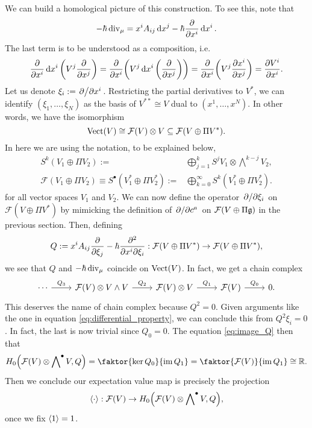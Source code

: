 We can build a homological picture of this construction. To see this, note that
\begin{equation}
-\hbar\operatorname{div}_\mu=x^i A_{ij}\dd{x}^j-\hbar\pdv{x^i}\dd{x^i}.
\end{equation}
The last term is to be understood as a composition, i.e.
\begin{equation}
\pdv{x^i}\dd{x^i}\qty(V^j\pdv{x^j})=\pdv{x^i}\qty(V^j\dd{x^i}\qty(\pdv{x^j}))=\pdv{x^i}\qty(V^j\pdv{x^i}{x^j})=\pdv{V^i}{x^i}.
\end{equation}
Let us denote $\xi_i:=\pdv*{x^i}$. Restricting the partial derivatives to $V^*$, we can identify $(\xi_1,\dots,\xi_N)$ as the basis of $V^{**}\cong V$ dual to $(x^1,\dots,x^N)$. In other words, we have the isomorphism
\begin{equation}\label{eq:polynomial_vectors}
\operatorname{Vect}(V)\cong \mathcal{F}(V)\otimes V\subseteq\mathcal{F}(V\oplus\Pi V^*).
\end{equation}
In here we are using the notation, to be explained below,
\begin{equation}
\begin{aligned}
S^k(V_1\oplus\Pi V_2):=&\bigoplus_{j=1}^k S^jV_1\otimes \bigwedge\nolimits^{k-j}V_2,\\
\mathcal{F}(V_1\oplus\Pi V_2)\equiv S^\bullet(V_1^*\oplus\Pi V_2^*):=&\bigoplus_{k=0}^\infty S^k(V_1^*\oplus\Pi V_2^*).
\end{aligned}
\end{equation} 
for all vector spaces $V_1$ and $V_2$. We can now define the operator $\pdv*{\xi_i}$ on $\mathcal{F}(V\oplus\Pi V^*)$ by mimicking the definition of $\pdv*{c^a}$ on $\mathcal{F}(V\oplus\Pi \mathfrak{g})$ in the previous section. Then, defining
\begin{equation}
Q:=x^i A_{ij}\pdv{\xi_j}-\hbar\pdv{}{x^i}{\xi_i}:\mathcal{F}(V\oplus\Pi V^*)\rightarrow\mathcal{F}(V\oplus\Pi V^*),
\end{equation}
we see that $Q$ and $-\hbar\operatorname{div}_\mu$ coincide on $\operatorname{Vect}(V)$. In fact, we get a chain complex 
\begin{equation}
\begin{tikzcd}
\cdots\arrow[r,"Q_3"]&\mathcal{F}(V)\otimes V\wedge V\arrow[r,"Q_2"]&\mathcal{F}(V)\otimes V \arrow[r,"Q_1"]&\mathcal{F}(V)\arrow[r,"Q_0"]& 0.
\end{tikzcd}
\end{equation}
This deserves the name of chain complex because $Q^2=0$. Given arguments like the one in equation \eqref{eq:differential_property}, we can conclude this from $Q^2\xi_i=0$. In fact, the last is now trivial since $Q_0=0$. The equation \eqref{eq:image_Q} then that
\begin{equation}
H_0\qty(\mathcal{F}(V)\otimes\bigwedge\nolimits^\bullet V,Q)=\faktor{\ker Q_0}{\im Q_1}=\faktor{\mathcal{F}(V)}{\im Q_1}\cong\mathbb{R}.
\end{equation}
Then we conclude our expectation value map is precisely the projection
\begin{equation}
\ev{\cdot}:\mathcal{F}(V)\rightarrow H_0\qty(\mathcal{F}(V)\otimes\bigwedge\nolimits^\bullet V,Q),
\end{equation}
once we fix $\ev{1}=1$.

